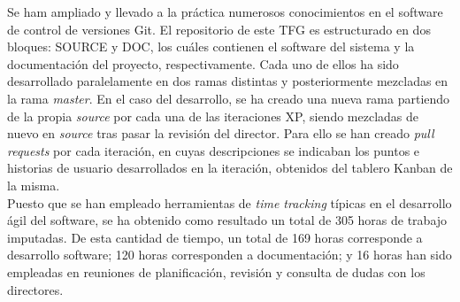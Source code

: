 Se ham ampliado y llevado a la práctica numerosos conocimientos en el software de control de versiones Git. El repositorio de este \gls{TFG} es estructurado en dos bloques: SOURCE y DOC, los cuáles contienen el software del sistema y la documentación del proyecto, respectivamente. Cada uno de ellos ha sido desarrollado paralelamente en dos ramas distintas y posteriormente mezcladas en la rama \textit{master}. En el caso del desarrollo, se ha creado una nueva rama partiendo de la propia \textit{source} por cada una de las iteraciones \gls{XP}, siendo mezcladas de nuevo en \textit{source} tras pasar la revisión del director. Para ello se han creado \textit{pull requests} por cada iteración, en cuyas descripciones se indicaban los puntos e historias de usuario desarrollados en la iteración, obtenidos del tablero Kanban de la misma.\\

Puesto que se han empleado herramientas de \textit{time tracking} típicas en el desarrollo ágil del software, se ha obtenido como resultado un total de 305 horas de trabajo imputadas. De esta cantidad de tiempo, un total de 169 horas corresponde a desarrollo software; 120 horas corresponden a documentación; y 16 horas han sido empleadas en reuniones de planificación, revisión y consulta de dudas con los directores.

